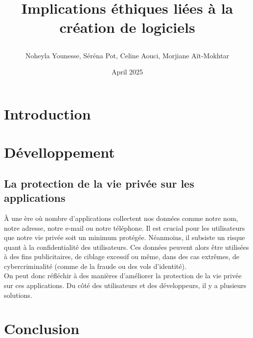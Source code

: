 \documentclass{article}
\title{Implications éthiques liées à la création de logiciels

}
\author{Noheyla Younesse, Séréna Pot, Celine Aouci, Morjiane Aït-Mokhtar}
\date{April 2025}
\begin{document}
\maketitle

\section{Introduction}

\section{Dévelloppement}
\subsection{La protection de la vie privée sur les applications}
À une ère où nombre d'applications collectent nos données  comme notre nom, notre adresse, notre e-mail ou notre téléphone. Il est crucial pour les utilisateurs que notre vie privée soit un minimum protégée. Néanmoins, il subsiste un risque quant à la confidentialité des utilisateurs. Ces données peuvent alors être utilisées à des fins publicitaires, de ciblage excessif ou même, dans des cas extrêmes, de cybercriminalité (comme de la fraude ou des vols d'identité).\\
On peut donc réfléchir à des manières d'améliorer la protection de la vie privée sur ces applications. Du côté des utilisateurs et des développeurs, il y a plusieurs solutions.


\section{Conclusion}
\end{document}
